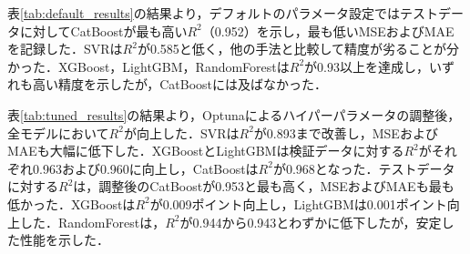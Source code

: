表\ref{tab:default_results}の結果より，デフォルトのパラメータ設定ではテストデータに対してCatBoostが最も高い$R^2$（0.952）を示し，最も低いMSEおよびMAEを記録した．SVRは$R^2$が0.585と低く，他の手法と比較して精度が劣ることが分かった．XGBoost，LightGBM，RandomForestは$R^2$が0.93以上を達成し，いずれも高い精度を示したが，CatBoostには及ばなかった．

表\ref{tab:tuned_results}の結果より，Optunaによるハイパーパラメータの調整後，全モデルにおいて$R^2$が向上した．SVRは$R^2$が0.893まで改善し，MSEおよびMAEも大幅に低下した．XGBoostとLightGBMは検証データに対する$R^2$がそれぞれ0.963および0.960に向上し，CatBoostは$R^2$が0.968となった．テストデータに対する$R^2$は，調整後のCatBoostが0.953と最も高く，MSEおよびMAEも最も低かった．XGBoostは$R^2$が0.009ポイント向上し，LightGBMは0.001ポイント向上した．RandomForestは，$R^2$が0.944から0.943とわずかに低下したが，安定した性能を示した．

